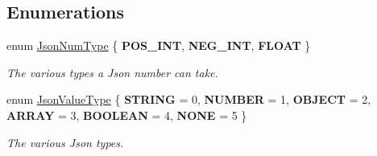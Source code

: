 \subsection*{Enumerations}
\begin{DoxyCompactItemize}
\item 
\mbox{\label{namespacenta_1_1utils_a83ee7c4cfccd9fa43564f5fe1c0c77d3}} 
enum \hyperlink{namespacenta_1_1utils_a83ee7c4cfccd9fa43564f5fe1c0c77d3}{Json\+Num\+Type} \{ {\bfseries P\+O\+S\+\_\+\+I\+NT}, 
{\bfseries N\+E\+G\+\_\+\+I\+NT}, 
{\bfseries F\+L\+O\+AT}
 \}\begin{DoxyCompactList}\small\item\em The various types a Json number can take. \end{DoxyCompactList}
\item 
\mbox{\label{namespacenta_1_1utils_ac9921c0a3baf86d9facdc4927c66def3}} 
enum \hyperlink{namespacenta_1_1utils_ac9921c0a3baf86d9facdc4927c66def3}{Json\+Value\+Type} \{ \newline
{\bfseries S\+T\+R\+I\+NG} = 0, 
{\bfseries N\+U\+M\+B\+ER} = 1, 
{\bfseries O\+B\+J\+E\+CT} = 2, 
{\bfseries A\+R\+R\+AY} = 3, 
\newline
{\bfseries B\+O\+O\+L\+E\+AN} = 4, 
{\bfseries N\+O\+NE} = 5
 \}\begin{DoxyCompactList}\small\item\em The various Json types. \end{DoxyCompactList}
\end{DoxyCompactItemize}
